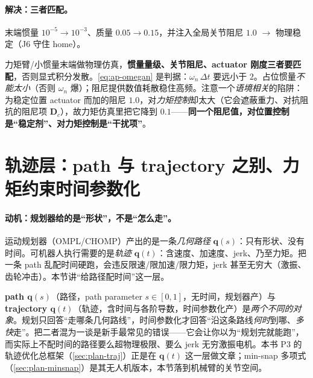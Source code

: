 \paragraph{解决：三者匹配。}
末端惯量 $10^{-5}\!\to\!10^{-3}$、质量 $0.05\!\to\!0.15$，并注入全局关节阻尼 $1.0$ $\to$ 物理稳定（J6 守住 home）。

\begin{insight}[仿真数值稳定的三要素必须匹配]\label{ins:ap-num3}
力矩臂/小惯量末端做物理仿真，\textbf{惯量量级、关节阻尼、actuator 刚度三者要匹配}，否则显式积分发散。\cref{eq:ap-omegan} 是判据：$\omega_n\,\Delta t$ 要远小于 $2$。占位惯量\emph{不能太小}（否则 $\omega_n$ 爆）；阻尼提供数值耗散稳住高频。注意一个\emph{语境相关}的陷阱：为稳定位置 actuator 而加的阻尼 $1.0$，对\emph{力矩控制}却太大（它会遮蔽重力、对抗阻抗的阻尼项 $\mathbf{D}_c$），故力矩仿真里把它降到 $0.1$——\textbf{同一个阻尼值，对位置控制是“稳定剂”、对力矩控制是“干扰项”}。
\end{insight}

\section{轨迹层：path 与 trajectory 之别、力矩约束时间参数化}
\label{sec:ap-traj}

\paragraph{动机：规划器给的是“形状”，不是“怎么走”。}
运动规划器（OMPL/CHOMP）产出的是一条\emph{几何路径} $\mathbf{q}(s)$：只有形状、没有时间。可机器人执行需要的是\emph{轨迹} $\mathbf{q}(t)$：含速度、加速度、jerk、乃至力矩。把一条 path 乱配时间硬跑，会违反限速/限加速/限力矩，jerk 甚至无穷大（激振、齿轮冲击）。本节讲“给路径配时间”这一层。

\begin{insight}\label{ins:ap-path-traj}
\textbf{path $\mathbf{q}(s)$}（路径，path parameter $s\in[0,1]$，无时间，规划器产）与 \textbf{trajectory $\mathbf{q}(t)$}（轨迹，含时间与各阶导数，时间参数化产）是\emph{两个不同的对象}。规划只回答“走哪条几何路线”，时间参数化才回答“沿这条路线\emph{何时}到哪、\emph{多快}走”。把二者混为一谈是新手最常见的错误——它会让你以为“规划完就能跑”，而实际上不配时间的路径要么超物理极限、要么 jerk 无穷激振电机。本书 P3 的轨迹优化总框架（\cref{sec:plan-traj}）正是在 $\mathbf{q}(t)$ 这一层做文章；min-snap 多项式（\cref{sec:plan-minsnap}）是其无人机版本，本节落到机械臂的关节空间。
\end{insight}

